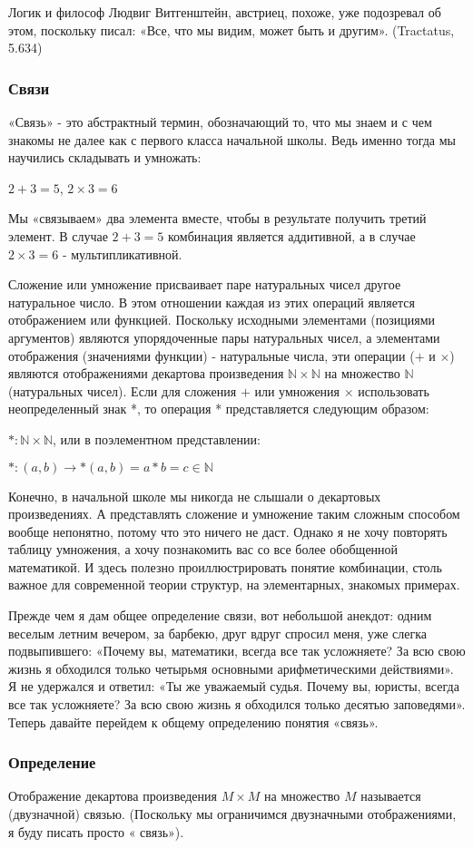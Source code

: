 Логик и философ Людвиг Витгенштейн, австриец, похоже, уже подозревал об этом, поскольку писал: «Все, что мы видим, может быть и другим». (Tractatus, 5.634)

\subsubsection{Связи}
«Связь» - это абстрактный термин, обозначающий то, что мы знаем и с чем знакомы не далее как с первого класса начальной школы. Ведь именно тогда мы научились складывать и умножать:

\vspace{0.5cm}
\(2+3=5\), \(2 \times 3=6\)
\vspace{0.5cm}

Мы «связываем» два элемента вместе, чтобы в результате получить третий элемент. В случае \(2 + 3 = 5\) комбинация является аддитивной, а в случае \(2 \times 3 = 6\) - мультипликативной.

Сложение или умножение присваивает паре натуральных чисел другое натуральное число. В этом отношении каждая из этих операций является отображением или функцией. Поскольку исходными элементами (позициями аргументов) являются упорядоченные пары натуральных чисел, а элементами отображения (значениями функции) - натуральные числа, эти операции (\(+\) и \(\times\)) являются отображениями
декартова произведения \(\mathbb{N} \times \mathbb{N}\) на множество \(\mathbb{N}\) (натуральных чисел). Если для сложения \(+\) или умножения \(\times\) использовать неопределенный знак *, то операция * представляется следующим образом:

\vspace{0.5cm}
\(*:\mathbb{N} \times \mathbb{N}\), или в поэлементном представлении:

\(*:(a,b)\rightarrow *(a,b)=a*b=c \in \mathbb{N}\)
\vspace{0.5cm}

Конечно, в начальной школе мы никогда не слышали о декартовых произведениях. А представлять сложение и умножение таким сложным способом вообще непонятно, потому что это ничего не даст. Однако я не хочу повторять таблицу умножения, а хочу познакомить вас со все более обобщенной математикой. И здесь полезно проиллюстрировать понятие комбинации, столь важное для современной теории структур, на элементарных, знакомых примерах.

Прежде чем я дам общее определение связи, вот небольшой анекдот: одним веселым летним вечером, за барбекю, друг вдруг спросил меня, уже слегка подвыпившего: «Почему вы, математики, всегда все так усложняете? За всю свою жизнь я обходился только четырьмя основными арифметическими действиями». Я не удержался и ответил: «Ты же уважаемый судья. Почему вы, юристы, всегда все так усложняете? За всю свою жизнь я обходился только десятью заповедями».
Теперь давайте перейдем к общему определению понятия «связь».

\subsubsection{Определение}
Отображение декартова произведения \(M \times M\) на множество \(M\) называется (двузначной) связью. (Поскольку мы ограничимся двузначными отображениями, я буду писать просто « связь»).

